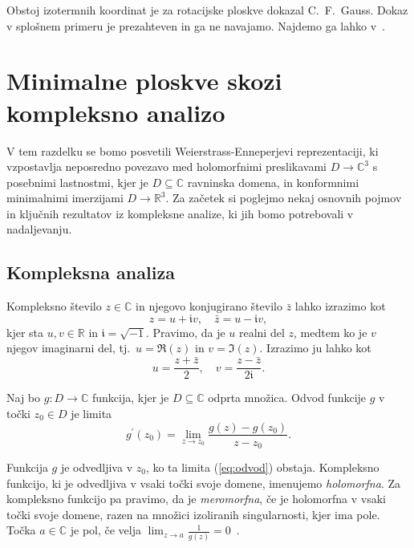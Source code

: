 \documentclass[fin1, tisk, bibtex]{fmfdelo}
\begin{document}
Obstoj izotermnih koordinat je za rotacijske ploskve dokazal C.~F.~Gauss. Dokaz v splošnem primeru je prezahteven in ga ne navajamo. Najdemo ga lahko v~\cite[Razdelek 1.8]{monograf}.




\section{Minimalne ploskve skozi kompleksno analizo}

V tem razdelku se bomo posvetili Weierstrass-Enneperjevi reprezentaciji, ki vzpostavlja neposredno povezavo med holomorfnimi preslikavami $D \rightarrow \mathbb{C}^3$ s posebnimi lastnostmi, kjer je $D \subseteq \mathbb{C}$ ravninska domena, in konformnimi minimalnimi imerzijami $D \rightarrow \mathbb{R}^3$. Za začetek si poglejmo nekaj osnovnih pojmov in ključnih rezultatov iz kompleksne analize, ki jih bomo potrebovali v nadaljevanju.


\subsection{Kompleksna analiza}

Kompleksno število $z \in \mathbb{C}$ in njegovo konjugirano število $\bar{z}$ lahko izrazimo kot
\begin{equation*}
    z=u+\mathfrak{i} v, \quad \bar{z}=u-\mathfrak{i} v,
\end{equation*}
kjer sta $u, v \in \mathbb{R}$ in $\mathfrak{i}=\sqrt{-1}$. Pravimo, da je $u$ realni del $z$, medtem ko je $v$ njegov imaginarni del, tj.~$u=\Re(z)$ in $v=\Im(z)$. Izrazimo ju lahko kot
\begin{equation}
    u=\frac{z+\bar{z}}{2}, \quad v=\frac{z-\bar{z}}{2 \mathfrak{i}} . \label{eq:uv}
\end{equation}

\begin{definicija}
    Naj bo $g: D \rightarrow \mathbb{C}$ funkcija, kjer je $D \subseteq \mathbb{C}$ odprta množica. Odvod funkcije $g$ v točki $z_0\in D$ je limita
    \begin{equation}
        g^{\prime}\left(z_0\right)=\lim _{z \rightarrow z_0} \frac{g(z)-g\left(z_0\right)}{z-z_0}. \label{eq:odvod}
    \end{equation}
\end{definicija}

Funkcija $g$ je odvedljiva v $z_0$, ko ta limita (\ref{eq:odvod}) obstaja. Kompleksno funkcijo, ki je odvedljiva v vsaki točki svoje domene, imenujemo \emph{holomorfna}. Za kompleksno funkcijo pa pravimo, da je \emph{meromorfna}, če je holomorfna v vsaki točki svoje domene, razen na množici izoliranih singularnosti, kjer ima pole. Točka $a \in \mathbb{C}$ je pol, če velja $\lim _{z \rightarrow a} \frac{1}{g(z)}=0$~\cite[str.~49]{sanbernardino}.
\end{document}
